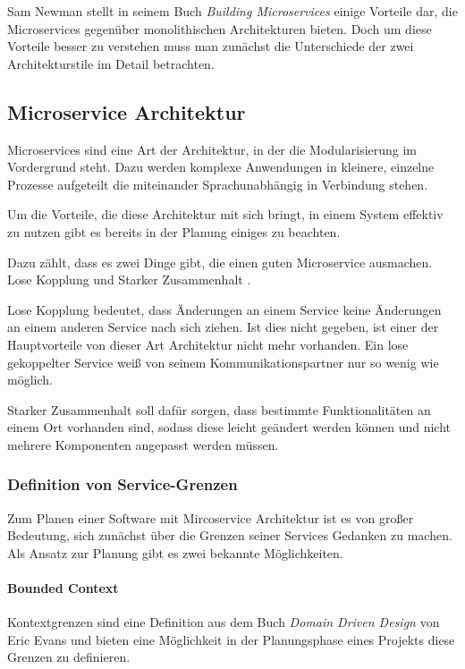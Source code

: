 \documentclass[12pt,a4paper,bibliography=totocnumbered,listof=totocnumbered]{scrartcl}
\begin{document}

Sam Newman stellt in seinem Buch \textit{Building Microservices}\cite{buildingms} einige Vorteile dar, die Microservices gegenüber monolithischen Architekturen bieten. Doch um diese Vorteile besser zu verstehen muss man zunächst die Unterschiede der zwei Architekturstile im Detail betrachten.

\subsection{Microservice Architektur}\label{ch:ms-arch}

Microservices sind eine Art der Architektur, in der die Modularisierung im Vordergrund steht. Dazu werden komplexe Anwendungen in kleinere, einzelne Prozesse aufgeteilt die miteinander Sprachunabhängig in Verbindung stehen. \cite[S. 2-3]{wolff}

Um die Vorteile, die diese Architektur mit sich bringt, in einem System effektiv zu nutzen gibt es bereits in der Planung einiges zu beachten.

Dazu zählt, dass es zwei Dinge gibt, die einen guten Microservice ausmachen. Lose Kopplung und Starker Zusammenhalt \cite[S.62]{buildingms}.

Lose Kopplung bedeutet, dass Änderungen an einem Service keine Änderungen an einem anderen Service nach sich ziehen. Ist dies nicht gegeben, ist einer der Hauptvorteile von dieser Art Architektur nicht mehr vorhanden.
Ein lose gekoppelter Service weiß von seinem Kommunikationspartner nur so wenig wie möglich.\cite[S.63]{buildingms}

Starker Zusammenhalt soll dafür sorgen, dass bestimmte Funktionalitäten an einem Ort vorhanden sind, sodass diese leicht geändert werden können und nicht mehrere Komponenten angepasst werden müssen.\cite[S.64]{buildingms}

\subsubsection{Definition von Service-Grenzen}

Zum Planen einer Software mit Mircoservice Architektur ist es von großer Bedeutung, sich zunächst über die Grenzen seiner Services Gedanken zu machen. Als Ansatz zur Planung gibt es zwei bekannte Möglichkeiten.

\paragraph{Bounded Context} Kontextgrenzen sind eine Definition aus dem Buch \textit{Domain Driven Design} von Eric Evans \cite{dddesign} und bieten eine Möglichkeit in der Planungsphase eines Projekts diese Grenzen zu definieren.
\end{document}
